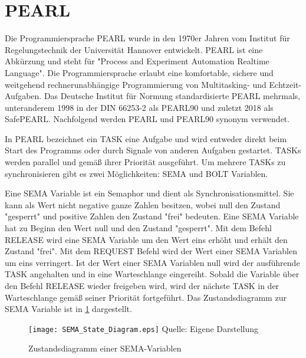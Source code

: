 \section{PEARL}
\label{section:PEARL}
Die Programmiersprache PEARL wurde in den 1970er Jahren vom Institut für
Regelungstechnik der Universität Hannover entwickelt. PEARL ist eine Abkürzung
und steht für "Process and Experiment Automation Realtime Language". Die
Programmiersprache erlaubt eine komfortable, sichere und weitgehend
rechnerunabhängige Programmierung von Multitasking- und
Echtzeit-Aufgaben.\autocite{PEARLHistory} Das Deutsche Institut für Normung
standardisierte PEARL mehrmals, unteranderem 1998 in der DIN 66253-2 als
PEARL90\autocite{DIN-66253-2:1998-04} und zuletzt 2018 als
SafePEARL\autocite{DIN-66253:2018-03}. Nachfolgend werden PEARL und PEARL90
synonym verwendet.

In PEARL bezeichnet ein \textrm{TASK} eine Aufgabe und wird entweder direkt beim
Start des Programms oder durch Signale von anderen Aufgaben gestartet.
\textrm{TASKs} werden parallel und gemäß ihrer Priorität
ausgeführt.\autocite[vgl.][104]{PEARL} Um mehrere \textrm{TASKs} zu
synchronisieren gibt es zwei Möglichkeiten: \textrm{SEMA} und \textrm{BOLT}
Variablen.\autocite[vgl.][120]{PEARL}

Eine \textrm{SEMA} Variable ist ein Semaphor und dient als
Synchronisationsmittel. Sie kann als Wert nicht negative ganze Zahlen besitzen,
wobei null den Zustand "gesperrt" und positive Zahlen den Zustand "frei"
bedeuten.\autocite[vgl.][120]{PEARL} Eine \textrm{SEMA} Variable hat zu Beginn
den Wert null und den Zustand "gesperrt". Mit dem Befehl \textrm{RELEASE} wird
eine \textrm{SEMA} Variable um den Wert eins erhöht und erhält den Zustand
"frei". Mit dem \textrm{REQUEST} Befehl wird der Wert einer \textrm{SEMA}
Variablen um eins verringert. Ist der Wert einer \textrm{SEMA} Variablen null
wird der ausführende \textrm{TASK} angehalten und in eine Warteschlange
eingereiht. Sobald die Variable über den Befehl \textrm{RELEASE} wieder
freigeben wird, wird der nächste \textrm{TASK} in der Warteschlange gemäß seiner
Priorität fortgeführt.\autocite[vgl.][120-121]{PEARL} Das Zustandsdiagramm zur
\textrm{SEMA} Variable ist in \cref{fig:SEMA_StateDiagram} dargestellt.
\begin{figure}[ht]
  \texttt{[image: SEMA\_State\_Diagram.eps]}
  \footnotesize\sffamily Quelle: Eigene Darstellung
  \caption{Zustandsdiagramm einer SEMA-Variablen}
  \label{fig:SEMA_StateDiagram}
\end{figure}

